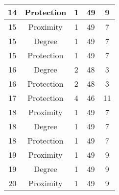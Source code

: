 \documentclass[results.tex]{subfiles}
\begin{document}
\begin{center}
\begin{tabular}{| c || c | c | c | c |}
            \hline
            14                      & Protection                   & 1                      & 49                      & 9                    \\
            \hline
            15                      & Proximity                    & 1                      & 49                      & 7                    \\
            \hline
            15                      & Degree                       & 1                      & 49                      & 7                    \\
            \hline
            15                      & Protection                   & 1                      & 49                      & 7                    \\
            \hline
            16                      & Degree                       & 2                      & 48                      & 3                    \\
            \hline
            16                      & Protection                   & 2                      & 48                      & 3                    \\
            \hline
            17                      & Protection                   & 4                      & 46                      & 11                   \\
            \hline
            18                      & Proximity                    & 1                      & 49                      & 7                    \\
            \hline
            18                      & Degree                       & 1                      & 49                      & 7                    \\
            \hline
            18                      & Protection                   & 1                      & 49                      & 7                    \\
            \hline
            19                      & Proximity                    & 1                      & 49                      & 9                    \\
            \hline
            19                      & Degree                       & 1                      & 49                      & 9                    \\
            \hline
            20                      & Proximity                    & 1                      & 49                      & 9                    \\

\end{tabular}
\end{center}
\end{document}
